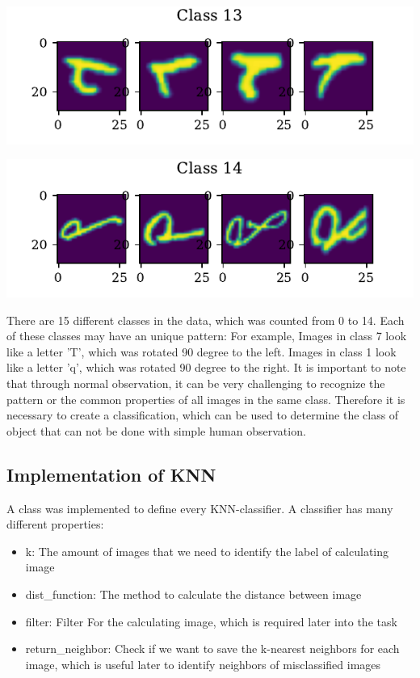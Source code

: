 \documentclass[11pt]{article}
\begin{document}
\includegraphics{figures/1a_sample_class_13.pdf}

\includegraphics{figures/1a_sample_class_14.pdf}

There are 15 different classes in the data, which was counted from 0 to 14. Each of these classes may have an unique pattern: For example, Images in class 7 look like a letter 'T', which was rotated 90 degree to the left. Images in class 1 look like a letter 'q', which was rotated 90 degree to the right. It is important to note that through normal observation, it can be very challenging to recognize the pattern or the common properties of all images in the same class. Therefore it is necessary to create a classification, which can be used to determine the class of object that can not be done with simple human observation.

\subsection{Implementation of KNN}

A class was implemented to define every KNN-classifier. A classifier has many different properties:
\begin{itemize}
    \item k: The amount of images that we need to identify the label of calculating image
    \item dist\_function: The method to calculate the distance between image
    \item filter: Filter For the calculating image, which is required later into the task
    \item return\_neighbor: Check if we want to save the k-nearest neighbors for each image, which is useful later to identify neighbors of misclassified images
\end{itemize}
\end{document}
